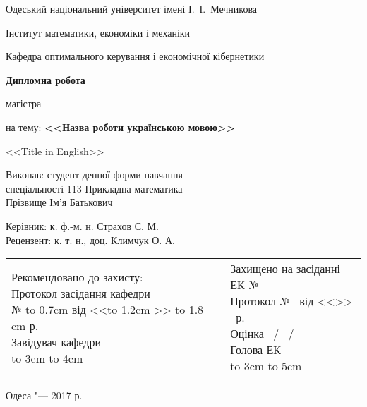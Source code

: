 \thispagestyle{empty}

\begin{center}
Одеський національний університет імені І.~І.~Мечникова

Інститут математики, економіки і механіки

Кафедра оптимального керування і економічної кібернетики
\end{center}

\vspace{2.5cm}

\begin{center}
\large
\textbf{Дипломна робота}

магістра

\bigskip

на тему: \textbf{<<Назва роботи українською мовою>>}

\bigskip

\small{<<Title in English>>}
\end{center}

\vfill

\hfill
\begin{minipage}{0.6\textwidth}
Виконав: студент денної форми навчання\\
спеціальності 113 Прикладна математика\\
Прізвище Ім'я Батькович

\medskip

Керівник: к. ф.-м. н. Страхов Є. М.\\
Рецензент: к. т. н., доц. Климчук О. А.
\end{minipage}

\vfill

\begin{flushleft}
\begin{tabular}{p{5cm}p{2.5cm}p{8cm}}
\makecell[l]{Рекомендовано до захисту:\\
Протокол засідання кафедри\\
№ \hbox to 0.7cm {\hrulefill} від <<\hbox to 1.2cm {\hrulefill}>> \hbox to 1.8 cm {\hrulefill} р.\\
Завідувач кафедри\\
\hbox to 3cm {\hrulefill} \hbox to 4cm{\hrulefill}
} & & \makecell[l]{Захищено на засіданні ЕК № \hrulefill \\
Протокол № \hrulefill\ від <<\hrulefill>> \hrulefill\ р.\\
Оцінка \hrulefill\ / \hrulefill\ / \hrulefill\ \\
Голова ЕК\\
\hbox to 3cm {\hrulefill} \hbox to 5cm{\hrulefill}}
\end{tabular}
\end{flushleft}


\vfill

\begin{center}
Одеса "--- 2017 р.
\end{center}
